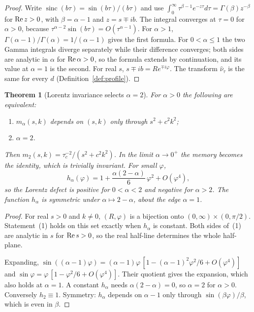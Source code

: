 \documentclass[11pt]{amsart}
\newtheorem{theorem}{Theorem}[section]
\theoremstyle{definition}
\theoremstyle{remark}
\newcommand{\sinc}{\operatorname{sinc}}
\begin{document}
\begin{proof}
Write $\sinc(b\tau)=\sin(b\tau)/(b\tau)$ and use $\int_0^\infty\tau^{\beta-1}e^{-z\tau}d\tau=\Gamma(\beta)z^{-\beta}$ for ${\rm Re}\,z>0$, with $\beta=\alpha-1$ and $z=s\mp ib$. The integral converges at $\tau=0$ for $\alpha>0$, because $\tau^{\alpha-2}\sin(b\tau)=O(\tau^{\alpha-1})$. For $\alpha>1$, $\Gamma(\alpha-1)/\Gamma(\alpha)=1/(\alpha-1)$ gives the first formula. For $0<\alpha\le1$ the two Gamma integrals diverge separately while their difference converges; both sides are analytic in $\alpha$ for ${\rm Re}\,\alpha>0$, so the formula extends by continuation, and its value at $\alpha=1$ is the second. For real $s$, $s\mp ib=Re^{\mp i\varphi}$. The transform $\hat\nu_\tau$ is the same for every $d$ (Definition~\ref{def:profile}).
\end{proof}

\begin{theorem}[Lorentz invariance selects $\alpha=2$]\label{thm:lorentz}
For $\alpha>0$ the following are equivalent:
\begin{enumerate}
\item $m_\alpha(s,k)$ depends on $(s,k)$ only through $s^2+c^2k^2$;
\item $\alpha=2$.
\end{enumerate}
Then $m_2(s,k)=\tau_c^{-2}/(s^2+c^2k^2)$. In the limit $\alpha\to0^+$ the memory becomes the identity, which is trivially invariant. For small $\varphi$,
\[
h_\alpha(\varphi)=1+\frac{\alpha(2-\alpha)}{6}\,\varphi^2+O(\varphi^4),
\]
so the Lorentz defect is positive for $0<\alpha<2$ and negative for $\alpha>2$. The function $h_\alpha$ is symmetric under $\alpha\mapsto2-\alpha$, about the edge $\alpha=1$.
\end{theorem}

\begin{proof}
For real $s>0$ and $k\ne0$, $(R,\varphi)$ is a bijection onto $(0,\infty)\times(0,\pi/2)$. Statement~(1) holds on this set exactly when $h_\alpha$ is constant. Both sides of~(1) are analytic in $s$ for ${\rm Re}\,s>0$, so the real half-line determines the whole half-plane.

Expanding, $\sin((\alpha-1)\varphi)=(\alpha-1)\varphi\,[1-(\alpha-1)^2\varphi^2/6+O(\varphi^4)]$ and $\sin\varphi=\varphi\,[1-\varphi^2/6+O(\varphi^4)]$. Their quotient gives the expansion, which also holds at $\alpha=1$. A constant $h_\alpha$ needs $\alpha(2-\alpha)=0$, so $\alpha=2$ for $\alpha>0$. Conversely $h_2\equiv1$. Symmetry: $h_\alpha$ depends on $\alpha-1$ only through $\sin(\beta\varphi)/\beta$, which is even in $\beta$.
\end{proof}
\end{document}
